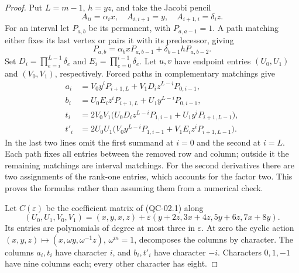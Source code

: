 \begin{proof}
Put $L=m-1$, $h=yz$, and take the Jacobi pencil
\[
 A_{ii}=\alpha_i x,\quad A_{i,i+1}=y,\quad A_{i+1,i}=\delta_i z.
\]
For an interval let $P_{a,b}$ be its permanent, with
$P_{a,a-1}=1$. A path matching either fixes its last vertex or
pairs it with its predecessor, giving
\[
 P_{a,b}=\alpha_bxP_{a,b-1}+\delta_{b-1}hP_{a,b-2}.
 \tag{QC-03.2}
\]
Set $D_i=\prod_{e=i}^{L-1}\delta_e$ and
$E_i=\prod_{e=0}^{i-1}\delta_e$. Let $u,v$ have endpoint entries
$(U_0,U_1)$ and $(V_0,V_1)$, respectively. Forced paths in
complementary matchings give
\begin{align*}
 a_i&=V_0y^iP_{i+1,L}+V_1D_i z^{L-i}P_{0,i-1},\\
 b_i&=U_0E_i z^iP_{i+1,L}+U_1y^{L-i}P_{0,i-1},\\
 t_i&=2V_0V_1\bigl(U_0D_i z^{L-i}P_{1,i-1}
                       +U_1y^iP_{i+1,L-1}\bigr),\\
 t'_i&=2U_0U_1\bigl(V_0y^{L-i}P_{1,i-1}
                       +V_1E_i z^iP_{i+1,L-1}\bigr).
\end{align*}
In the last two lines omit the first summand at $i=0$ and the
second at $i=L$. Each path fixes all entries between the removed
row and column; outside it the remaining matchings are interval
matchings. For the second derivatives there are two assignments
of the rank-one entries, which accounts for the factor two.
This proves the formulas rather than assuming them from a numerical
check.

Let $C(\varepsilon)$ be the coefficient matrix of (QC-02.1) along
\[
 (U_0,U_1,V_0,V_1)=(x,y,x,z)+
       \varepsilon(y+2z,3x+4z,5y+6z,7x+8y).
 \tag{QC-03.3}
\]
Its entries are polynomials of degree at most three in $\varepsilon$.
At zero the cyclic action $(x,y,z)\mapsto(x,\omega y,\omega^{-1}z)$,
$\omega^m=1$, decomposes the columns by character. The columns
$a_i,t_i$ have character $i$, and $b_i,t'_i$ have character $-i$.
Characters $0,1,-1$ have nine columns each; every other character
has eight.


\end{proof}
